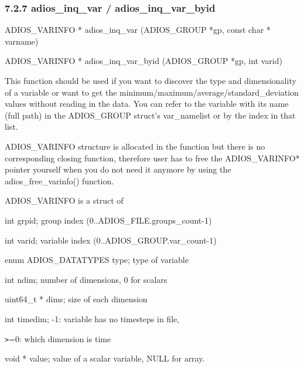 \subsubsection*{{\large \textbf{7.2.7 adios\_inq\_var / adios\_inq\_var\_byid}}}

\vspace{10pt}
ADIOS\_VARINFO * adios\_inq\_var (ADIOS\_GROUP *gp, const char * varname)

\vspace{10pt}
ADIOS\_VARINFO * adios\_inq\_var\_byid (ADIOS\_GROUP *gp, int varid)

\vspace{22pt}
This function should be used if you want to discover the type and dimensionality 
of a variable or want to get the minimum/maximum/average/standard\_deviation values 
without reading in the data. You can refer to the variable with its name (full 
path) in the ADIOS\_GROUP struct's var\_namelist or by the index in that list. 

\vspace{10pt}
ADIOS\_VARINFO structure is allocated in the function but there is no corresponding 
closing function, therefore user has to free the ADIOS\_VARINFO* pointer yourself 
when you do not need it anymore by using the adios\_free\_varinfo() function.

\vspace{10pt}
ADIOS\_VARINFO is a struct of 

\vspace{10pt}
\leftskip=22pt
int  grpid;  group index (0..ADIOS\_FILE.groups\_count-1)

\vspace{10pt}
int  varid; variable index (0..ADIOS\_GROUP.var\_count-1)

\vspace{10pt}
enum ADIOS\_DATATYPES type;           type of variable

\vspace{10pt}
int ndim;  number of dimensions, 0 for scalars 

\vspace{10pt}
uint64\_t  * dims;  size of each dimension 

\vspace{10pt}
int timedim;  -1: variable has no timesteps in file,

\vspace{10pt}
\parindent=39pt
\texttt{>}=0: which dimension is time

\vspace{10pt}
\parindent=0pt
void      * value;  value of a scalar variable, NULL for array.

